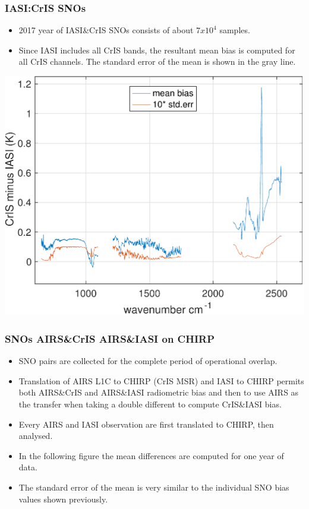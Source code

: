 \documentclass[10pt,t]{beamer}
\begin{document}
\begin{frame}
  \frametitle{IASI:CrIS SNOs}
  \begin{itemize}
  \item 2017 year of IASI\&CrIS SNOs consists of about $7 x 10^4$ samples.
    \item Since IASI includes all CrIS bands, the resultant mean bias is computed for all CrIS channels. The standard error of the mean is shown in the gray line.
  \end{itemize}

  \begin{center}
    \includegraphics[width=0.66\linewidth]{./Figs/Pdf/ic_sno_nsr_2017_bias_stder_lw_mw_sw.pdf}
  \end{center}

\end{frame}

\begin{frame}
  \frametitle{SNOs AIRS\&CrIS AIRS\&IASI on CHIRP}
  \begin{itemize}
  \item SNO pairs are collected for the complete period of operational overlap.
  \item Translation of AIRS L1C to CHIRP (CrIS MSR) and IASI to CHIRP permits both AIRS\&CrIS and AIRS\&IASI radiometric bias and then to use AIRS as the transfer when taking a double different to compute CrIS\&IASI bias.
  \item Every AIRS and IASI observation are first translated to CHIRP, then analysed.
  \item In the following figure the mean differences are computed for one year of data.
    \item The standard error of the mean is very similar to the individual SNO bias values shown previously.
  \end{itemize}
\end{frame}
\end{document}
